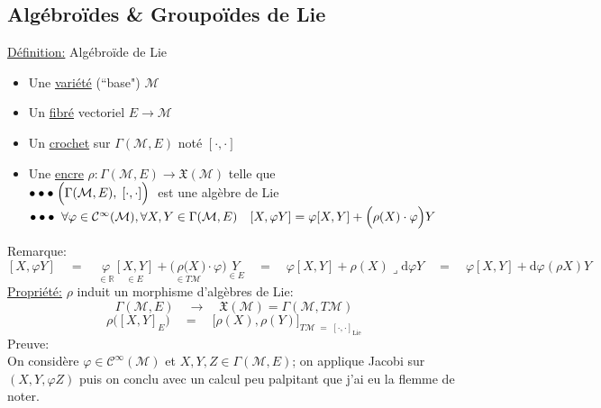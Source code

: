 \documentclass[a4paper,11pt]{article}
\renewcommand{\d}{{\mathrm{d}}}
\begin{document}
\subsection{Algébroïdes \& Groupoïdes de Lie}
\underline{Définition:} Algébroïde de Lie
\begin{itemize}
\item Une \underline{variété} (``base") $\mathcal M$
\item Un \underline{fibré} vectoriel $E\to\mathcal{M}$
\item Un \underline{crochet} sur $\Gamma(\mathcal{M},E)$ noté $[\cdot,\cdot]$
\item Une \underline{encre} $\rho:\Gamma(\mathcal{M},E)\to\mathfrak{X}(\mathcal M)$ telle que\\
\color{white}$\bullet\bullet\color{black}\bullet\;\Big(\Gamma(\mathcal M, E), \; [\cdot,\cdot]\Big)\;$\color{black} est une algèbre de Lie \\
\color{white}$\bullet\bullet\color{black}\bullet\;\;\forall\varphi\in\mathcal{C}^\infty(\mathcal{M}),\forall X,Y\in\Gamma(\mathcal{M},E) \quad [X,\varphi Y] = \varphi [X,Y] + \Big(\rho(X)\cdot\varphi\Big) Y\;$\color{black}
\end{itemize}
Remarque:
$$[X,\varphi Y] \quad=\quad \underset{\in\mathbb{R}}\varphi \underset{\in E}{[X,Y]} + \Big(\underset{\in T\mathcal{M}}{\rho(X})\cdot\varphi\Big) \underset{\in E}Y \quad=\quad \varphi [X,Y] + \rho(X)\lrcorner\d\varphi Y \quad=\quad\varphi [X,Y] + \d\varphi(\rho X) Y$$
\underline{Propriété:}
$\rho$ induit un morphisme d'algèbres de Lie:
$$\Gamma(\mathcal{M},E)\quad \longrightarrow\quad\mathfrak{X}(\mathcal{M})=\Gamma(\mathcal{M},T\mathcal{M})$$
$$\rho\Big([X,Y]_E\Big) \quad = \quad \Big[\rho(X),\rho(Y)\Big]_{T\mathcal{M}\;=\;[\cdot,\cdot]_\mathrm{Lie}}$$
Preuve:\\
On considère $\varphi\in\mathcal{C}^\infty(\mathcal{M})$ et $X,Y,Z\in\Gamma(\mathcal{M},E)$; on applique Jacobi sur $(X,Y,\varphi Z)$ puis on conclu avec un calcul peu palpitant que j'ai eu la flemme de noter.\\
\end{document}
